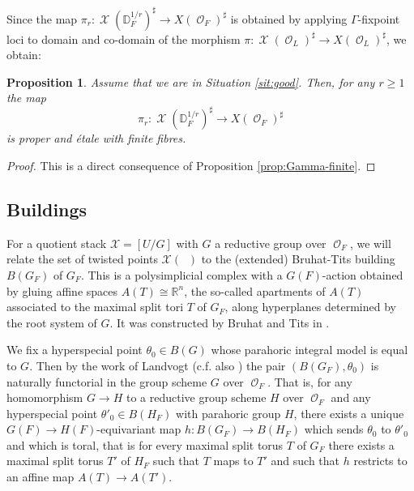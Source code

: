 \documentclass{article}
\DeclareMathOperator{\Xc}{\mathcal{X}}
\DeclareMathOperator{\Oc}{\mathcal{O}}
\DeclareMathOperator{\CO}{\mathcal{O}}
\newcommand{\BR}{{\mathbb{R}}}
\newcommand{\CX}{{\mathcal X}}
\newcommand{\Dr}[1][r]{\mathbb{D}_F^{1/#1}}
\DeclareMathOperator{\Dinfty}{\mathbb{D}_F^{1/\infty}}
\theoremstyle{definition}
\theoremstyle{plain}
\newtheorem{proposition}[definition]{Proposition}
\begin{document}
Since the map $\pi_r \colon \Xc(\Dr)^{\sharp} \to X(\Oc_F)^{\sharp}$ is obtained by applying $\Gamma$-fixpoint loci to domain and co-domain of the morphism
$\pi\colon \Xc(\Oc_L)^{\sharp} \to X(\Oc_L)^{\sharp}$, we obtain:

\begin{proposition}\label{prop:r-finite}
Assume that we are in Situation \ref{sit:good}. Then, for any $r\geq 1$ the map
$$\pi_{r}\colon \Xc(\Dr)^{\sharp} 
\to X(\Oc_F)^\sharp$$
is proper and \'etale with finite fibres.
\end{proposition}
\begin{proof}
This is a direct consequence of Proposition \ref{prop:Gamma-finite}.
\end{proof}


\subsection{Buildings}
For a quotient stack $\CX=[U/G]$ with $G$ a reductive group over $\CO_F$, we will relate the set of twisted points $\CX(\Dinfty)$ to the (extended) Bruhat-Tits building $B(G_F)$ of $G_F$. This is a polysimplicial complex with a $G(F)$-action obtained by gluing affine spaces $A(T)\cong \BR^n$, the so-called apartments of $A(T)$ associated to the maximal split tori $T$ of $G_F$, along hyperplanes determined by the root system of $G$. It was constructed by Bruhat and Tits in \cite{BT1}.

We fix a hyperspecial point $\theta_0 \in B(G)$ whose parahoric integral model is equal to $G$. Then by the work of Landvogt \cite{MR1739403} (c.f. also \cite[Theorem 127]{MR4129311}) the pair $(B(G_F),\theta_0)$ is naturally functorial in the group scheme $G$ over $\CO_F$. That is, for any homomorphism $G \to H$ to a reductive group scheme $H$ over $\CO_F$ and any hyperspecial point $\theta'_0 \in B(H_F)$ with parahoric group $H$, there exists a unique $G(F) \to H(F)$-equivariant map $h\colon B(G_F) \to B(H_F)$ which sends $\theta_0$ to $\theta'_0$ and which is toral, that is for every maximal split torus $T$ of $G_F$ there exists a maximal split torus $T'$ of $H_F$ such that $T$ maps to $T'$ and such that $h$ restricts to an affine map $A(T) \to A(T')$.
\end{document}
